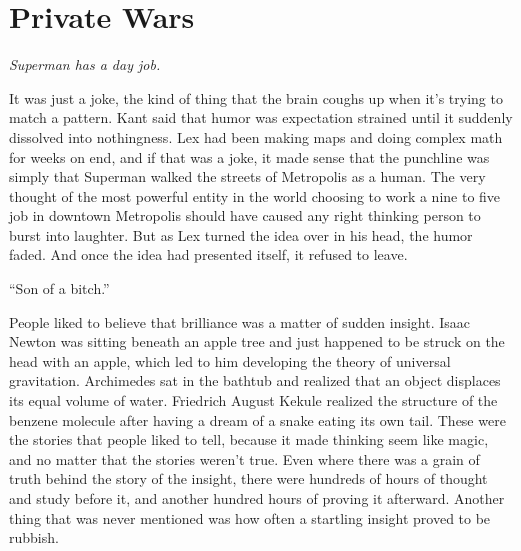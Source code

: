 \hypertarget{private-wars}{%
\chapter{Private Wars}\label{private-wars}}

\emph{Superman has a day job.}

It was just a joke, the kind of thing that the brain coughs up when it's
trying to match a pattern. Kant said that humor was expectation strained
until it suddenly dissolved into nothingness. Lex had been making maps
and doing complex math for weeks on end, and if that was a joke, it made
sense that the punchline was simply that Superman walked the streets of
Metropolis as a human. The very thought of the most powerful entity in
the world choosing to work a nine to five job in downtown Metropolis
should have caused any right thinking person to burst into laughter. But
as Lex turned the idea over in his head, the humor faded. And once the
idea had presented itself, it refused to leave.

``Son of a bitch.''

People liked to believe that brilliance was a matter of sudden insight.
Isaac Newton was sitting beneath an apple tree and just happened to be
struck on the head with an apple, which led to him developing the theory
of universal gravitation. Archimedes sat in the bathtub and realized
that an object displaces its equal volume of water. Friedrich August
Kekule realized the structure of the benzene molecule after having a
dream of a snake eating its own tail. These were the stories that people
liked to tell, because it made thinking seem like magic, and no matter
that the stories weren't true. Even where there was a grain of truth
behind the story of the insight, there were hundreds of hours of thought
and study before it, and another hundred hours of proving it afterward.
Another thing that was never mentioned was how often a startling insight
proved to be rubbish.


